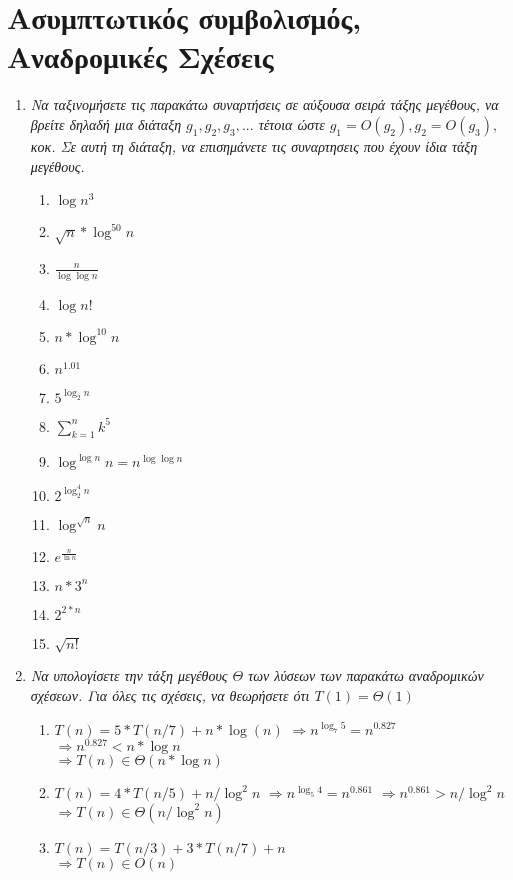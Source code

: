 \documentclass[a4paper,10pt]{article} \usepackage{anysize}
\begin{document}

\section{Ασυμπτωτικός συμβολισμός, Αναδρομικές
Σχέσεις} \setcounter{section}{1}
\begin{enumerate}
\item \textit{Να ταξινομήσετε τις παρακάτω συναρτήσεις σε αύξουσα σειρά τάξης
μεγέθους, να βρείτε δηλαδή μια διάταξη $g_1,g_2,g_3,...$ τέτοια ώστε $g_1 =
O(g_2),g_2=O(g_3),$ κοκ. Σε αυτή τη διάταξη, να επισημάνετε τις συναρτησεις
που έχουν ίδια τάξη μεγέθους.}
\begin{enumerate}
\item $\log {n^3}$
\item $\sqrt{n}*\log^{50}{n} $
\item $\frac{n}{\log{\log{n}} } $
\item $\log{n!} $
\item $n*\log^{10}{n} $
\item $n^{1.01} $
\item $5^{\log_{2}{n}} $
\item $\sum_{k=1}^n{k^5} $
\item $\log^{\log{n}}{n} = n^{\log{\log{n}} } $
\item $2^{\log_2^4{n}} $
\item $\log^{\sqrt{n}}{n} $
\item $e^{\frac{n}{\ln{n}} } $
\item $n*3^n $
\item $2^{2*n} $
\item $\sqrt{n!} $
\end{enumerate}
\item \textit{Να υπολογίσετε την τάξη μεγέθους $\Theta$ των λύσεων των παρακάτω αναδρομικών
σχέσεων. Για όλες τις σχέσεις, να θεωρήσετε ότι $T(1)=\Theta(1)$}
\begin{enumerate}
\item $T(n)=5*T(n/7)+n*\log(n)$
$\Rightarrow n^{\log _7 {5}} = n^{0.827}$
$\Rightarrow n^{0.827} < n*\log{n}$\\
$\Rightarrow T(n) \in \Theta(n*\log{n})$

\item $T(n) = 4*T(n/5)+n/\log^2{n}$
$\Rightarrow n^{\log_5 {4}} = n^{0.861}$
$\Rightarrow n^{0.861} > n/\log^2{n}$\\
$\Rightarrow T(n) \in \Theta(n/\log^2{n})$

\item $T(n) = T(n/3) +3*T(n/7)+n$\\
$\Rightarrow T(n) \in O(n)$


\end{enumerate}
\end{enumerate}
\end{document}
